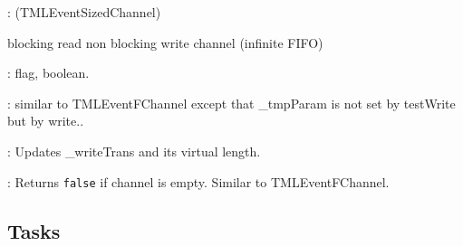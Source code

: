 \documentclass[a4paper,11pt]{article}
\newcommand{\bfont}{\fontseries{b}\selectfont}
\newcommand{\cod}[1]{{\ttfamily #1}}
\newcommand{\class}[2]{\par\vspace{1mm}\hspace{-5mm}\large\colorbox{file}{\textbullet\bfont\cod{#1}:} (\cod{#2})\par}
\newcommand{\method}[1]{\par\vspace{1mm}\hspace{-2mm}\colorbox{method}{\textopenbullet\bfont\cod{#1}:}}
\newcommand{\variable}[1]{\par\vspace{1mm}\hspace{-2mm}\colorbox{variable}{\textopenbullet\bfont\cod{#1}:}}
\begin{document}
\class{TMLEventBChannel}{TMLEventSizedChannel}
blocking read non blocking write channel (infinite FIFO)
\variable{\_requestChannel} flag, boolean.
\method{testRead(), write()} similar to \cod{TMLEventFChannel} except that \cod{\_tmpParam} is not set by \cod{testWrite} but by \cod{write}..
\method{testWrite()} Updates \cod{\_writeTrans} and its virtual length.
\method{read()} Returns {\tt false} if channel is empty. Similar to \cod{TMLEventFChannel}.

\subsection*{Tasks}
\end{document}
